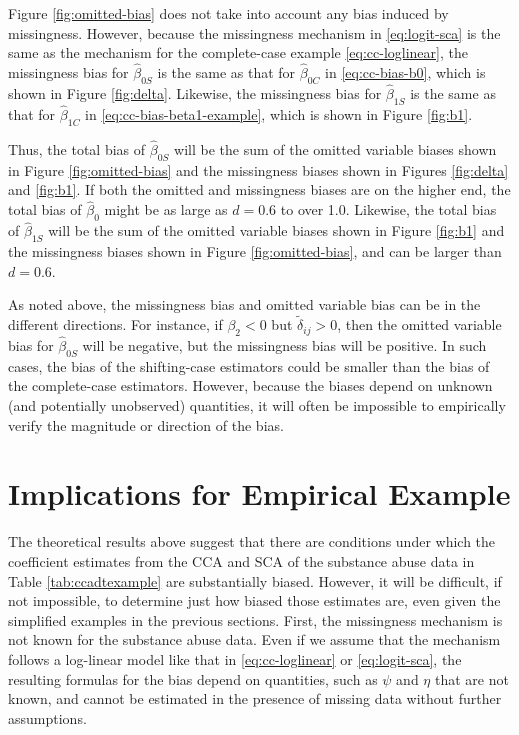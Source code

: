 \documentclass[
]{article}
\begin{document}
Figure \ref{fig:omitted-bias} does not take into account any bias induced by missingness.
However, because the missingness mechanism in \eqref{eq:logit-sca} is the same as the mechanism for the complete-case example \eqref{eq:cc-loglinear}, the missingness bias for \(\hat{\beta}_{0S}\) is the same as that for \(\hat{\beta}_{0C}\) in \eqref{eq:cc-bias-b0}, which is shown in Figure \ref{fig:delta}.
Likewise, the missingness bias for \(\hat{\beta}_{1S}\) is the same as that for \(\hat{\beta}_{1C}\) in \eqref{eq:cc-bias-beta1-example}, which is shown in Figure \ref{fig:b1}.

Thus, the total bias of \(\hat{\beta}_{0S}\) will be the sum of the omitted variable biases shown in Figure \ref{fig:omitted-bias} and the missingness biases shown in Figures \ref{fig:delta} and \ref{fig:b1}.
If both the omitted and missingness biases are on the higher end, the total bias of \(\hat{\beta}_0\) might be as large as \(d = 0.6\) to over 1.0.
Likewise, the total bias of \(\hat{\beta}_{1S}\) will be the sum of the omitted variable biases shown in Figure \ref{fig:b1} and the missingness biases shown in Figure \ref{fig:omitted-bias}, and can be larger than \(d = 0.6\).

As noted above, the missingness bias and omitted variable bias can be in the different directions.
For instance, if \(\beta_2 < 0\) but \(\tilde{\delta}_{ij} > 0\), then the omitted variable bias for \(\hat{\beta}_{0S}\) will be negative, but the missingness bias will be positive.
In such cases, the bias of the shifting-case estimators could be smaller than the bias of the complete-case estimators.
However, because the biases depend on unknown (and potentially unobserved) quantities, it will often be impossible to empirically verify the magnitude or direction of the bias.

\hypertarget{implications-for-empirical-example}{%
\section{Implications for Empirical Example}\label{implications-for-empirical-example}}

The theoretical results above suggest that there are conditions under which the coefficient estimates from the CCA and SCA of the substance abuse data in Table \ref{tab:ccadtexample} are substantially biased.
However, it will be difficult, if not impossible, to determine just how biased those estimates are, even given the simplified examples in the previous sections.
First, the missingness mechanism is not known for the substance abuse data.
Even if we assume that the mechanism follows a log-linear model like that in \eqref{eq:cc-loglinear} or \eqref{eq:logit-sca}, the resulting formulas for the bias depend on quantities, such as \(\psi\) and \(\eta\) that are not known, and cannot be estimated in the presence of missing data without further assumptions.
\end{document}
